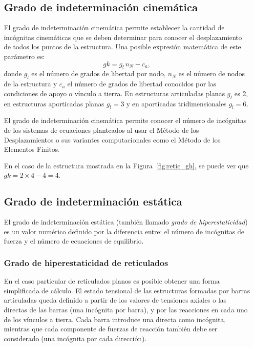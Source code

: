 \subsection{Grado de indeterminación cinemática}

El grado de indeterminación cinemática permite establecer la cantidad de incógnitas cinemáticas que se deben determinar para conocer el desplazamiento de todos los puntos de la estructura.
%
Una posible expresión matemática de este parámetro es:
%
\begin{equation}
	gk = g_l \, n_N - c_a,
\end{equation}
%
donde $g_l$ es el número de grados de libertad por nodo, $n_N$ es el número de nodos de la estructura y $c_a$ el número de grados de libertad conocidos por las condiciones de apoyo o vínculo a tierra. %
%
En estructuras articuladas planas $g_l$ es 2, en estructuras aporticadas planas $g_l=3$ y en aporticadas tridimensionales $g_l=6$.

El grado de indeterminación cinemática permite conocer el número de incógnitas de los sistemas de ecuaciones planteados al usar el Método de los Desplazamientos o sus variantes computacionales como el Método de los Elementos Finitos.

En el caso de la estructura mostrada en la Figura~\ref{fig:retic_gh}, se puede ver que $gk=2\times 4 - 4=4$.


\subsection{Grado de indeterminación estática}

El grado de indeterminación estática (también llamado \textit{grado de hiperestaticidad}) es un valor numérico definido por la diferencia entre: el número de incógnitas de fuerza y el número de ecuaciones de equilibrio. %
%

\subsubsection{Grado de hiperestaticidad de reticulados}

En el caso particular de reticulados planos es posible obtener una forma simplificada de cálculo. %
% 
El estado tensional de las estructuras formadas por barras articuladas queda definido a partir de los valores de tensiones axiales o las directas de las barras (una incógnita por barra), y por las reacciones en cada uno de los vínculos a tierra. %
%
Cada barra introduce una directa como incógnita, mientras que cada componente de fuerzas de reacción también debe ser considerado (una incógnita por cada dirección).

